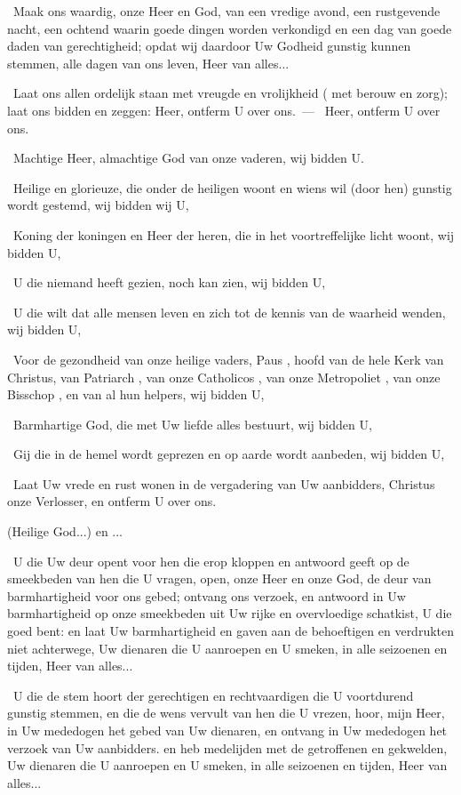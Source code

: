 \documentclass[12pt,twoside,a5paper]{article}
\begin{document}
\begin{halfparskip}\begin{sfpar}
  \cc~Maak ons waardig, onze Heer en God, van een vredige avond, een rustgevende nacht, een ochtend waarin goede dingen worden verkondigd en een dag van goede daden van gerechtigheid; opdat wij daardoor Uw Godheid gunstig kunnen stemmen, alle dagen van ons leven, Heer van alles...


  \dd~Laat ons allen ordelijk staan met vreugde en vrolijkheid ( met berouw en zorg); laat ons bidden en zeggen: Heer, ontferm U over ons.~--- \rr~Heer, ontferm U over ons. 

  \dd~Machtige Heer, almachtige God van onze vaderen, wij bidden U.

  \dd~Heilige en glorieuze, die onder de heiligen woont en wiens wil (door hen) gunstig wordt gestemd, wij bidden wij U,

  \dd~Koning der koningen en Heer der heren, die in het voortreffelijke licht woont, wij bidden U,

  \dd~U die niemand heeft gezien, noch kan zien, wij bidden U,

  \dd~U die wilt dat alle mensen leven en zich tot de kennis van de waarheid wenden, wij bidden U,

  \dd~Voor de gezondheid van onze heilige vaders, Paus \NN, hoofd van de hele Kerk van Christus, van Patriarch \NN, van onze Catholicos \NN, van onze Metropoliet \NN, van onze Bisschop \NN, en van al hun helpers, wij bidden U,

  \dd~Barmhartige God, die met Uw liefde alles bestuurt, wij bidden U,

  \dd~Gij die in de hemel wordt geprezen en op aarde wordt aanbeden, wij bidden U,

  \dd~Laat Uw vrede en rust wonen in de vergadering van Uw aanbidders, Christus onze Verlosser, en ontferm U over ons.

   (Heilige God...) en ...

  \cc~U die Uw deur opent voor hen die erop kloppen en antwoord geeft op de smeekbeden van hen die U vragen, open, onze Heer en onze God, de deur van barmhartigheid voor ons gebed; ontvang ons verzoek, en antwoord in Uw barmhartigheid op onze smeekbeden uit Uw rijke en overvloedige schatkist, U die goed bent: en laat Uw barmhartigheid en gaven aan de behoeftigen en verdrukten niet achterwege, Uw dienaren die U aanroepen en U smeken, in alle seizoenen en tijden, Heer van alles...

  \cc~U die de stem hoort der gerechtigen en rechtvaardigen die U voortdurend gunstig stemmen, en die de wens vervult van hen die U vrezen, hoor, mijn Heer, in Uw mededogen het gebed van Uw dienaren, en ontvang in Uw mededogen het verzoek van Uw aanbidders. en heb medelijden met de getroffenen en gekwelden, Uw dienaren die U aanroepen en U smeken, in alle seizoenen en tijden, Heer van alles...

  \fullline
\end{sfpar}\end{halfparskip}
\end{document}
